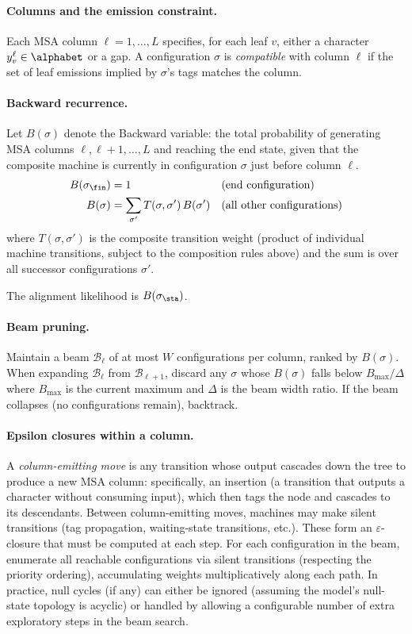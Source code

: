 \paragraph{Columns and the emission constraint.}
Each MSA column $\ell = 1,\ldots,L$ specifies, for each leaf $v$,
either a character $y_v^\ell \in \alphabet$ or a gap.
A configuration $\sigma$ is \emph{compatible} with column $\ell$
if the set of leaf emissions implied by $\sigma$'s tags matches the column.

\paragraph{Backward recurrence.}
Let $B(\sigma)$ denote the Backward variable: the total probability of
generating MSA columns $\ell, \ell+1, \ldots, L$ and reaching the end state,
given that the composite machine is currently in configuration $\sigma$ just before column $\ell$.
\begin{align}
B(\sigma_{\fin}) &= 1 && \mbox{(end configuration)} \label{eq:back-base}\\
B(\sigma) &= \sum_{\sigma'} T(\sigma, \sigma')\, B(\sigma') && \mbox{(all other configurations)} \label{eq:back-rec}
\end{align}
where $T(\sigma,\sigma')$ is the composite transition weight
(product of individual machine transitions, subject to the composition rules above)
and the sum is over all successor configurations $\sigma'$.

The alignment likelihood is $B(\sigma_{\sta})$.

\paragraph{Beam pruning.}
Maintain a beam $\mathcal{B}_\ell$ of at most $W$ configurations per column,
ranked by $B(\sigma)$.
When expanding $\mathcal{B}_\ell$ from $\mathcal{B}_{\ell+1}$,
discard any $\sigma$ whose $B(\sigma)$ falls below $B_{\max} / \Delta$
where $B_{\max}$ is the current maximum and $\Delta$ is the beam width ratio.
If the beam collapses (no configurations remain), backtrack.

\paragraph{Epsilon closures within a column.}
A \emph{column-emitting move} is any transition whose output cascades down the tree
to produce a new MSA column: specifically, an insertion (a transition that outputs a character
without consuming input), which then tags the node and cascades to its descendants.
Between column-emitting moves, machines may make silent transitions
(tag propagation, waiting-state transitions, etc.).
These form an $\varepsilon$-closure that must be computed at each step.
For each configuration in the beam, enumerate all reachable configurations
via silent transitions (respecting the priority ordering),
accumulating weights multiplicatively along each path.
In practice, null cycles (if any) can either be ignored (assuming the model's
null-state topology is acyclic) or handled by allowing a configurable number
of extra exploratory steps in the beam search.

